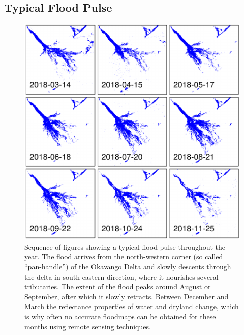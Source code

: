 \documentclass[abstract=on,10pt,a4paper,bibliography=totocnumbered]{scrartcl}
\begin{document}
\subsection{Typical Flood Pulse}
\label{Appendix:FloodPulse}
\begin{figure}[h]
  \begin{center}
    \includegraphics[width = \textwidth]{99_FloodPulse.pdf}
    \caption{Sequence of figures showing a typical flood pulse throughout the
    year. The flood arrives from the north-western corner (so called
    ``pan-handle'') of the Okavango Delta and slowly descents through the delta
    in south-eastern direction, where it nourishes several tributaries. The
    extent of the flood peaks around August or September, after which it slowly
    retracts. Between December and March the reflectance properties of water and
    dryland change, which is why often no accurate floodmaps can be obtained for
    these months using remote sensing techniques.}
    \label{FloodPulse}
  \end{center}
\end{figure}

\newpage
\end{document}
